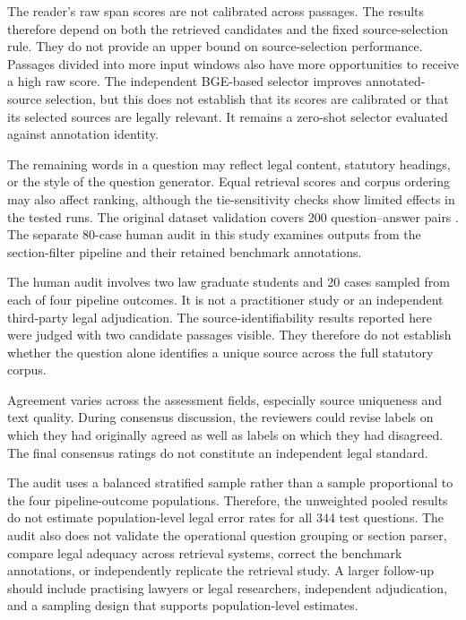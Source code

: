 \documentclass[pdflatex,sn-basic]{sn-jnl}%
\theoremstyle{thmstyleone}%
\theoremstyle{thmstyletwo}%
\theoremstyle{thmstylethree}%
\begin{document}
The reader's raw span scores are not calibrated across passages. The results
therefore depend on both the retrieved candidates and the fixed
source-selection rule. They do not provide an upper bound on
source-selection performance. Passages divided into more input windows also
have more opportunities to receive a high raw score. The independent
BGE-based selector improves annotated-source selection, but this does not
establish that its scores are calibrated or that its selected sources are
legally relevant. It remains a zero-shot selector evaluated against annotation
identity.

The remaining words in a question may reflect legal content, statutory
headings, or the style of the question generator. Equal retrieval scores and
corpus ordering may also affect ranking, although the tie-sensitivity checks
show limited effects in the tested runs. The original dataset validation
covers 200 question--answer pairs \citep{anonymous2026indiciprqa}. The
separate 80-case human audit in this study examines outputs from the
section-filter pipeline and their retained benchmark annotations.

The human audit involves two law graduate students and 20 cases sampled from
each of four pipeline outcomes. It is not a practitioner study or an
independent third-party legal adjudication. The source-identifiability results
reported here were judged with two candidate passages visible. They therefore
do not establish whether the question alone identifies a unique source across
the full statutory corpus.

Agreement varies across the assessment fields, especially source uniqueness
and text quality. During consensus discussion, the reviewers could revise
labels on which they had originally agreed as well as labels on which they
had disagreed. The final consensus ratings do not constitute an independent
legal standard.

The audit uses a balanced stratified sample rather than a sample proportional
to the four pipeline-outcome populations. Therefore, the unweighted pooled
results do not estimate population-level legal error rates for all 344 test
questions. The audit also does not validate the operational question grouping
or section parser, compare legal adequacy across retrieval systems, correct
the benchmark annotations, or independently replicate the retrieval study.
A larger follow-up should include practising lawyers or legal researchers,
independent adjudication, and a sampling design that supports population-level
estimates.
\end{document}
